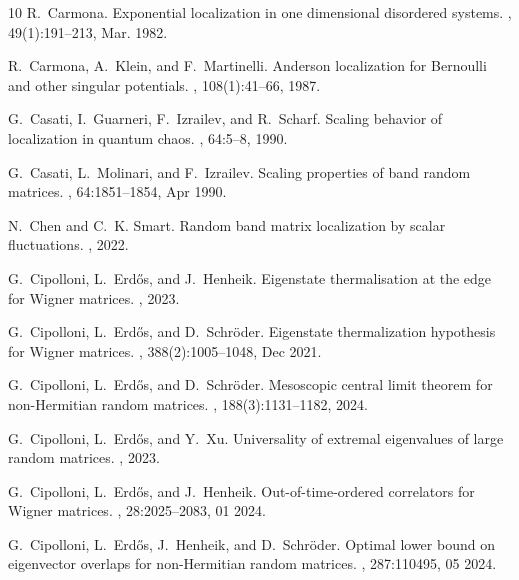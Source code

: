 \documentclass[10pt,reqno]{amsart}
\numberwithin{equation}{section}
\numberwithin{figure}{section}
\theoremstyle{plain} %
\theoremstyle{definition} %
\numberwithin{equation}{section}
\begin{document}
\begin{thebibliography}{10}
	R.~Carmona.
	\newblock Exponential localization in one dimensional disordered systems.
	, 49(1):191--213, Mar. 1982.
	
	R.~Carmona, A.~Klein, and F.~Martinelli.
	\newblock Anderson localization for {Bernoulli} and other singular potentials.
	, 108(1):41--66, 1987.
	
	G.~Casati, I.~Guarneri, F.~Izrailev, and R.~Scharf.
	\newblock Scaling behavior of localization in quantum chaos.
	, 64:5--8, 1990.
	
	G.~Casati, L.~Molinari, and F.~Izrailev.
	\newblock Scaling properties of band random matrices.
	, 64:1851--1854, Apr 1990.
	
	N.~Chen and C.~K. Smart.
	\newblock Random band matrix localization by scalar fluctuations.
	, 2022.
	
	G.~Cipolloni, L.~Erd{\H{o}}s, and J.~Henheik.
	\newblock Eigenstate thermalisation at the edge for {Wigner} matrices.
	, 2023.
	
	G.~Cipolloni, L.~Erd{\H{o}}s, and D.~Schr{\"o}der.
	\newblock Eigenstate thermalization hypothesis for {W}igner matrices.
	, 388(2):1005--1048, Dec
	2021.
	
	G.~Cipolloni, L.~Erd{\H{o}}s, and D.~Schr{\"o}der.
	\newblock Mesoscopic central limit theorem for non-{H}ermitian random matrices.
	, 188(3):1131--1182, 2024.
	
	G.~Cipolloni, L.~Erd{\H{o}}s, and Y.~Xu.
	\newblock Universality of extremal eigenvalues of large random matrices.
	, 2023.
	
	G.~Cipolloni, L.~Erdős, and J.~Henheik.
	\newblock Out-of-time-ordered correlators for {W}igner matrices.
	,
	28:2025--2083, 01 2024.
	
	G.~Cipolloni, L.~Erdős, J.~Henheik, and D.~Schröder.
	\newblock Optimal lower bound on eigenvector overlaps for non-{H}ermitian
	random matrices.
	, 287:110495, 05 2024.
	

\end{thebibliography}
\end{document}
